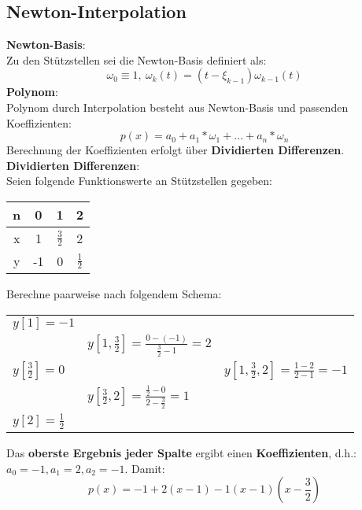 \subsection{Newton-Interpolation}%
\label{pi:sub:newton-interpolation}
\textbf{Newton-Basis}:\\Zu den Stützstellen sei die Newton-Basis definiert als: $$\omega_0 \equiv 1,\ \omega_k(t) = (t - \xi_{k-1})\omega_{k-1}(t)$$
\textbf{Polynom}:\\Polynom durch Interpolation besteht aus Newton-Basis und passenden Koeffizienten: $$p(x) = a_0 + a_1 * \omega_1 + ... + a_n * \omega_n$$
Berechnung der Koeffizienten erfolgt über \textbf{Dividierten Differenzen}.
\newpage
\noindent\textbf{Dividierten Differenzen}:\\
Seien folgende Funktionswerte an Stützstellen gegeben:
\begin{center}
	\begin{tabular}{c | c c c}
		n & 0 & 1 & 2\\
		\hline
		x & 1 & $\frac{3}{2}$ & 2\\
		y & -1 & 0 & $\frac{1}{2}$
	\end{tabular}
\end{center}
Berechne paarweise nach folgendem Schema:
\begin{center}
	\begin{tabular}{l l l}
		$y[1] = -1$ 				&																		&\\
									& $y[1, \frac{3}{2}] = \frac{0 - (-1)}{\frac{3}{2} - 1} = 2$ 			&\\
		$y[\frac{3}{2}] = 0$		& 																		& $y[1, \frac{3}{2}, 2] = \frac{1 - 2}{2 - 1} = -1$\\
									& $y[\frac{3}{2}, 2] = \frac{\frac{1}{2} - 0}{2 - \frac{3}{2}} = 1$		&\\
		$y[2] = \frac{1}{2}$		&																		&
	\end{tabular}
\end{center}
Das \textbf{oberste Ergebnis jeder Spalte} ergibt einen \textbf{Koeffizienten}, d.h.: $a_0 = -1, a_1 = 2, a_2 = -1$. Damit:
$$p(x) = -1 + 2(x - 1) -1(x - 1)(x - \frac{3}{2})$$

